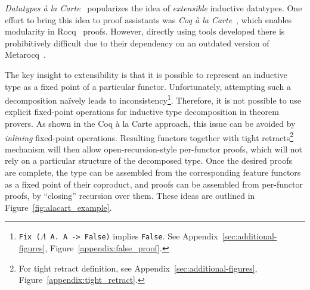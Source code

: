 \documentclass[sigplan,nonacm,review]{acmart}
\begin{document}
\emph{Datatypes à la Carte}~\cite{swierstra2008data}
popularizes the idea of
\emph{extensible} inductive datatypes. 
One effort to bring this idea to proof assistants
was \emph{Coq à la Carte}~\cite{forster2020coq},
which enables modularity in Rocq~\cite{the_coq_development_team_2024_14542673} proofs.
However,
directly using tools developed there
is prohibitively difficult
due to their dependency on an outdated version of Metarocq~\cite{sozeau2020metacoq}.

The key insight to extensibility is that it is possible to represent an inductive type as a fixed point of a particular functor. Unfortunately, attempting such a decomposition na\"ively leads to inconsistency\footnote{\texttt{Fix ($\Lambda$ A. A -> False)} implies \texttt{False}. See Appendix~\ref{sec:additional-figures}, Figure~\ref{appendix:false_proof}.}. 
Therefore, it is not possible to use explicit fixed-point operations for inductive type decomposition in theorem provers.
As shown in the Coq à la Carte approach,
this issue can be avoided by \emph{inlining} fixed-point operations.  
Resulting functors together with tight retracts\footnote{For tight retract definition, see Appendix~\ref{sec:additional-figures}, Figure~\ref{appendix:tight_retract}.} mechanism will then allow open-recursion-style per-functor proofs,
which will not rely on a particular structure of the decomposed type.
Once the desired proofs are complete,
the type can be assembled from the corresponding feature functors as a fixed point of their coproduct,
and proofs can be assembled from
per-functor proofs,
by ``closing'' recursion over them. These ideas are outlined in Figure~\ref{fig:alacart_example}.
\end{document}
